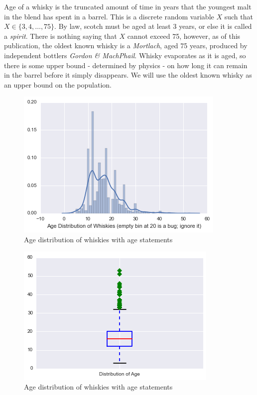 Age of a whisky is the truncated amount of time in years that the youngest malt in the blend has spent in a barrel. This is a discrete random variable $X$ such that $X \in \{3, 4, \hdots, 75\}$. By law, scotch must be aged at least 3 years, or else it is called a \textit{spirit}. There is nothing saying that $X$ cannot exceed 75, however, as of this publication, the oldest known whisky is a \textit{Mortlach}, aged 75 years, produced by independent bottlers \textit{Gordon \& MachPhail}. Whisky evaporates as it is aged, so there is some upper bound - determined by physics - on how long it can remain in the barrel before it simply disappears. We will use the oldest known whisky as an upper bound on the population.

\begin{figure}[htb]
\centering
\includegraphics[scale=1]{age_distribution}
\caption{Age distribution of whiskies with age statements}
\label{fig:age_distribution} 
\end{figure}



\pagebreak


\begin{figure}[htb]
\centering
\includegraphics[scale=1]{boxplot_age} 
\caption{Age distribution of whiskies with age statements}
\label{fig:boxplot_age_distribution} 
\end{figure}


